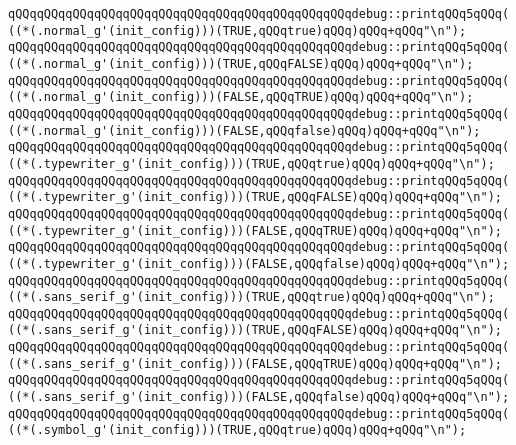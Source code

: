 \newline
\verb|qQQqqQQqqQQqqQQqqQQqqQQqqQQqqQQqqQQqqQQqqQQqqQQqdebug::printqQQq5qQQq(((*(.normal_g'(init_config)))(TRUE,qQQqtrue)qQQq)qQQq+qQQq"\n");|\newline
\verb|qQQqqQQqqQQqqQQqqQQqqQQqqQQqqQQqqQQqqQQqqQQqqQQqdebug::printqQQq5qQQq(((*(.normal_g'(init_config)))(TRUE,qQQqFALSE)qQQq)qQQq+qQQq"\n");|\newline
\verb|qQQqqQQqqQQqqQQqqQQqqQQqqQQqqQQqqQQqqQQqqQQqqQQqdebug::printqQQq5qQQq(((*(.normal_g'(init_config)))(FALSE,qQQqTRUE)qQQq)qQQq+qQQq"\n");|\newline
\verb|qQQqqQQqqQQqqQQqqQQqqQQqqQQqqQQqqQQqqQQqqQQqqQQqdebug::printqQQq5qQQq(((*(.normal_g'(init_config)))(FALSE,qQQqfalse)qQQq)qQQq+qQQq"\n");|\newline
\newline
\verb|qQQqqQQqqQQqqQQqqQQqqQQqqQQqqQQqqQQqqQQqqQQqqQQqdebug::printqQQq5qQQq(((*(.typewriter_g'(init_config)))(TRUE,qQQqtrue)qQQq)qQQq+qQQq"\n");|\newline
\verb|qQQqqQQqqQQqqQQqqQQqqQQqqQQqqQQqqQQqqQQqqQQqqQQqdebug::printqQQq5qQQq(((*(.typewriter_g'(init_config)))(TRUE,qQQqFALSE)qQQq)qQQq+qQQq"\n");|\newline
\verb|qQQqqQQqqQQqqQQqqQQqqQQqqQQqqQQqqQQqqQQqqQQqqQQqdebug::printqQQq5qQQq(((*(.typewriter_g'(init_config)))(FALSE,qQQqTRUE)qQQq)qQQq+qQQq"\n");|\newline
\verb|qQQqqQQqqQQqqQQqqQQqqQQqqQQqqQQqqQQqqQQqqQQqqQQqdebug::printqQQq5qQQq(((*(.typewriter_g'(init_config)))(FALSE,qQQqfalse)qQQq)qQQq+qQQq"\n");|\newline
\newline
\verb|qQQqqQQqqQQqqQQqqQQqqQQqqQQqqQQqqQQqqQQqqQQqqQQqdebug::printqQQq5qQQq(((*(.sans_serif_g'(init_config)))(TRUE,qQQqtrue)qQQq)qQQq+qQQq"\n");|\newline
\verb|qQQqqQQqqQQqqQQqqQQqqQQqqQQqqQQqqQQqqQQqqQQqqQQqdebug::printqQQq5qQQq(((*(.sans_serif_g'(init_config)))(TRUE,qQQqFALSE)qQQq)qQQq+qQQq"\n");|\newline
\verb|qQQqqQQqqQQqqQQqqQQqqQQqqQQqqQQqqQQqqQQqqQQqqQQqdebug::printqQQq5qQQq(((*(.sans_serif_g'(init_config)))(FALSE,qQQqTRUE)qQQq)qQQq+qQQq"\n");|\newline
\verb|qQQqqQQqqQQqqQQqqQQqqQQqqQQqqQQqqQQqqQQqqQQqqQQqdebug::printqQQq5qQQq(((*(.sans_serif_g'(init_config)))(FALSE,qQQqfalse)qQQq)qQQq+qQQq"\n");|\newline
\newline
\verb|qQQqqQQqqQQqqQQqqQQqqQQqqQQqqQQqqQQqqQQqqQQqqQQqdebug::printqQQq5qQQq(((*(.symbol_g'(init_config)))(TRUE,qQQqtrue)qQQq)qQQq+qQQq"\n");|\newline
